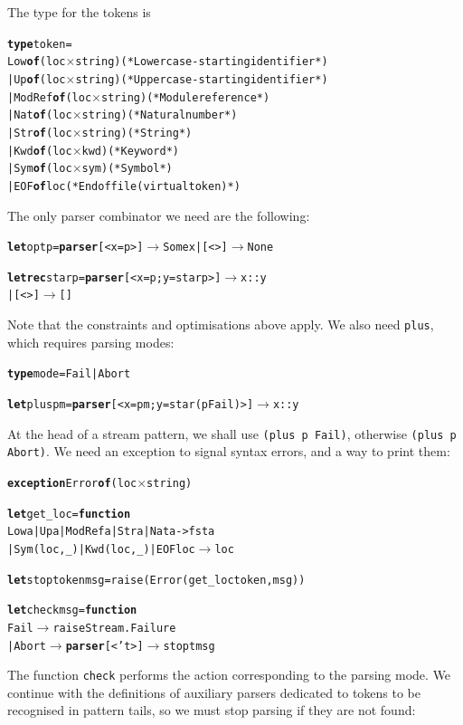 The type for the tokens is
\begin{alltt}
\textbf{type} token =
  Low    \textbf{of} (loc \(\times\) string)  (* Lowercase-starting identifier *)
| Up     \textbf{of} (loc \(\times\) string)  (* Uppercase-starting identifier *)
| ModRef \textbf{of} (loc \(\times\) string)  (* Module reference *)
| Nat    \textbf{of} (loc \(\times\) string)  (* Natural number *)
| Str    \textbf{of} (loc \(\times\) string)  (* String *)
| Kwd    \textbf{of} (loc \(\times\) kwd)     (* Keyword *)
| Sym    \textbf{of} (loc \(\times\) sym)     (* Symbol *)
| EOF    \textbf{of} loc              (* End of file (virtual token) *)
\end{alltt}
The only parser combinator we need are the following:
\begin{alltt}
\textbf{let} opt p = \textbf{parser} [< x=p >] \(\rightarrow\) Some x | [<>] \(\rightarrow\) None

\textbf{let rec} star p = \textbf{parser} [< x=p; y=star p >] \(\rightarrow\) x::y
                      |                [<>] \(\rightarrow\) []
\end{alltt}
Note that the constraints and optimisations above apply. We also need
\texttt{plus}, which requires parsing modes:
\begin{alltt}
\textbf{type} mode = Fail | Abort

\textbf{let} plus p m = \textbf{parser} [< x=p m; y=star (p Fail) >] \(\rightarrow\) x::y
\end{alltt}
At the head of a stream pattern, we shall use \texttt{(plus p Fail)},
otherwise \texttt{(plus p Abort)}. We need an exception to signal
syntax errors, and a way to print them:
\begin{alltt}
\textbf{exception} Error \textbf{of} (loc \(\times\) string)

\textbf{let} get\_loc = \textbf{function}
  Low a | Up a | ModRef a | Str a | Nat a -> fst a
| Sym (loc,\_) | Kwd (loc,\_) | EOF loc \(\rightarrow\) loc

\textbf{let} stop token msg = raise (Error (get\_loc token, msg))

\textbf{let} check msg = \textbf{function}
   Fail \(\rightarrow\) raise Stream.Failure
| Abort \(\rightarrow\) \textbf{parser} [< 't >] \(\rightarrow\) stop t msg
\end{alltt}
The function \texttt{check} performs the action corresponding to the
parsing mode. We continue with the definitions of auxiliary parsers
dedicated to tokens to be recognised in pattern tails, so we must stop
parsing if they are not found:
